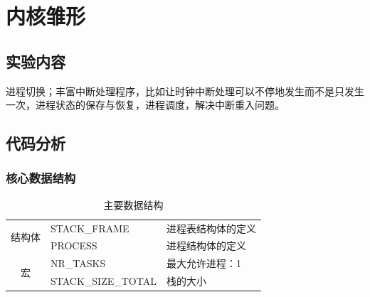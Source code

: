 \chapter{内核雏形}\label{cha:latex-brief-intro}

\section{实验内容}
进程切换；丰富中断处理程序，比如让时钟中断处理可以不停地发生而不是只发生一次，进程状态的保存与恢复，进程调度，解决中断重入问题。

\section{代码分析}

\subsection{核心数据结构}

\begin{table}[H]
\begin{center}
\caption{主要数据结构}
\begin{tabular}{|c|l|l|}
\hline
\multirow{2}{*}{结构体} & STACK\_FRAME       & 进程表结构体的定义 \\ \cline{2-3} 
                     & PROCESS            & 进程结构体的定义  \\ \hline
\multirow{2}{*}{宏}   & NR\_TASKS          & 最大允许进程：1  \\ \cline{2-3} 
                     & STACK\_SIZE\_TOTAL & 栈的大小      \\ \hline
\end{tabular}
\end{center}
\end{table}


